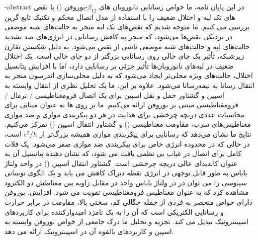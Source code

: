 % 
% 
% 
% 
% 
% 
\fa-abstract{
    در این پایان نامه، ما خواص رسانایی نانوروبان های $\beta_{12}$-بوروفن () با نقص های تک لبه و اختلال ضعیف را با استفاده از مدل اتصال محکم و تکنیک تابع گرین بررسی می کنیم. ما متوجه شدیم که نقص‌های تک لبه منجر به حالت‌های شبه موضعی در نزدیکی نقص‌ها می‌شود، که منجر به کاهش رسانایی در انرژی‌های ضد تشدید حالت‌های لبه و حالت‌های شبه موضعی ناشی از نقص می‌شود. به دلیل شکستن تقارن زیرشبکه، تأثیر یک جای خالی روی رسانایی بزرگتر از دو جای خالی است. یک اختلال ضعیف در لبه‌های نانوروبان‌ها تأثیر جزئی بر رسانایی دارد، اما با افزایش پتانسیل اختلال، حالت‌های ویژه محلی‌تر ایجاد می‌شود که به دلیل محلی‌سازی اندرسون منجر به انتقال رسانا به نیمه‌رسانا می‌شود. علاوه بر این، ما یک تحلیل نظری از انتقال وابسته به اسپین و گشتاور حمل و نقل اسپین برای یک اتصال فرومغناطیسی / نرمال / فرومغناطیسی مبتنی بر بوروفن ارائه می‌کنیم. ما بر روی ها به عنوان مبنایی برای محاسبات عددی دریچه چرخشی برای هدایت در هر دو پیکربندی موازی و ضد موازی مغناطیس‌های سرب، مقاومت مغناطیسی () و گشتاور انتقال اسپین () تمرکز می‌کنیم. نتایج ما نشان می‌دهد که رسانایی برای پیکربندی موازی همیشه بزرگ‌تر از $e^2/h$ است، در حالی که در محدوده انرژی خاص برای پیکربندی ضد موازی صفر می‌شود. یک فلات  کامل برای اتصال در غیاب بی نظمی یافت می شود، که نشان دهنده پتانسیل آن به عنوان کاندیدای عالی دریچه چرخشی است. گشتاور انتقال اسپین () در واحد ولتاژ بایاس به طور قابل توجهی در انرژی نقطه دیراک کاهش می یابد و یک الگوی نوسانی سینوسی را می توان در  در ولتاژ بایاس واحد در مقابل زاویه بین مغناطش دو الکترود مشاهده کرد که به عنوان مغناطیس فرومغناطیسی تقویت می شود. افزایش. بوروفن دارای خواص منحصر به فردی از جمله چگالی کم، سختی بالا، مقاومت در برابر حرارت و رسانایی الکتریکی است که آن را به یک نامزد امیدوارکننده برای کاربردهای اسپینترونیک تبدیل می کند. تجزیه و تحلیل ما درک جامعی از خواص بوروفن وابسته به اسپین و کاربردهای بالقوه آن در اسپینترونیک ارائه می دهد.
}

\abstractPage

\newpage\clearpage